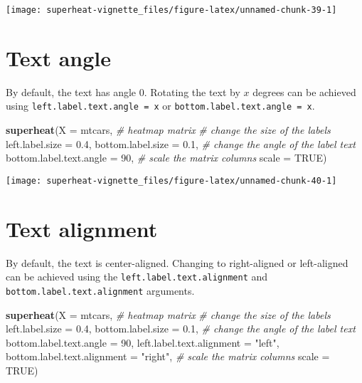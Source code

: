 \documentclass[]{book}
\newenvironment{Shaded}{\begin{snugshade}}{\end{snugshade}}
\newcommand{\KeywordTok}[1]{\textcolor[rgb]{0.13,0.29,0.53}{\textbf{{#1}}}}
\newcommand{\DataTypeTok}[1]{\textcolor[rgb]{0.13,0.29,0.53}{{#1}}}
\newcommand{\DecValTok}[1]{\textcolor[rgb]{0.00,0.00,0.81}{{#1}}}
\newcommand{\FloatTok}[1]{\textcolor[rgb]{0.00,0.00,0.81}{{#1}}}
\newcommand{\StringTok}[1]{\textcolor[rgb]{0.31,0.60,0.02}{{#1}}}
\newcommand{\CommentTok}[1]{\textcolor[rgb]{0.56,0.35,0.01}{\textit{{#1}}}}
\newcommand{\OtherTok}[1]{\textcolor[rgb]{0.56,0.35,0.01}{{#1}}}
\newcommand{\NormalTok}[1]{{#1}}
\theoremstyle{definition}
\theoremstyle{definition}
\theoremstyle{remark}
\begin{document}
\begin{center}\texttt{[image: superheat-vignette\_files/figure-latex/unnamed-chunk-39-1]} \end{center}

\section{Text angle}\label{text-angle-1}

By default, the text has angle 0. Rotating the text by \(x\) degrees can
be achieved using \texttt{left.label.text.angle\ =\ x} or
\texttt{bottom.label.text.angle\ =\ x}.

\begin{Shaded}
\begin{Highlighting}[]
\KeywordTok{superheat}\NormalTok{(}\DataTypeTok{X =} \NormalTok{mtcars, }\CommentTok{# heatmap matrix}
          \CommentTok{# change the size of the labels}
          \DataTypeTok{left.label.size =} \FloatTok{0.4}\NormalTok{,}
          \DataTypeTok{bottom.label.size =} \FloatTok{0.1}\NormalTok{,}
          \CommentTok{# change the angle of the label text}
          \DataTypeTok{bottom.label.text.angle =} \DecValTok{90}\NormalTok{,}
          \CommentTok{# scale the matrix columns}
          \DataTypeTok{scale =} \OtherTok{TRUE}\NormalTok{)}
\end{Highlighting}
\end{Shaded}

\begin{center}\texttt{[image: superheat-vignette\_files/figure-latex/unnamed-chunk-40-1]} \end{center}

\section{Text alignment}\label{text-alignment}

By default, the text is center-aligned. Changing to right-aligned or
left-aligned can be achieved using the
\texttt{left.label.text.alignment} and
\texttt{bottom.label.text.alignment} arguments.

\begin{Shaded}
\begin{Highlighting}[]
\KeywordTok{superheat}\NormalTok{(}\DataTypeTok{X =} \NormalTok{mtcars, }\CommentTok{# heatmap matrix}
          \CommentTok{# change the size of the labels}
          \DataTypeTok{left.label.size =} \FloatTok{0.4}\NormalTok{,}
          \DataTypeTok{bottom.label.size =} \FloatTok{0.1}\NormalTok{,}
          \CommentTok{# change the angle of the label text}
          \DataTypeTok{bottom.label.text.angle =} \DecValTok{90}\NormalTok{,}
          \DataTypeTok{left.label.text.alignment =} \StringTok{"left"}\NormalTok{,}
          \DataTypeTok{bottom.label.text.alignment =} \StringTok{"right"}\NormalTok{,}
          \CommentTok{# scale the matrix columns}
          \DataTypeTok{scale =} \OtherTok{TRUE}\NormalTok{)}
\end{Highlighting}
\end{Shaded}
\end{document}
